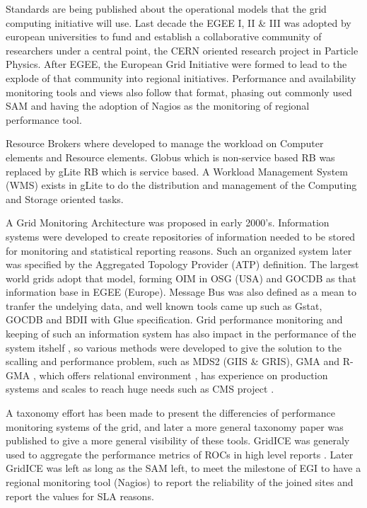 Standards are being published about the operational models that the grid computing initiative will use. Last decade the EGEE I, II \& III was adopted by european universities to fund and establish a collaborative community of researchers under a central point, the CERN oriented research project in Particle Physics. After EGEE, the European Grid Initiative were formed to lead to the explode of that community into regional initiatives. Performance and availability monitoring tools and views also follow that format, phasing out commonly used SAM \cite{egee3dsa122} and having the adoption of Nagios as the monitoring of regional performance tool.

Resource Brokers \cite{Kertesz06ataxonomy} where developed to manage the workload on Computer elements and Resource elements. Globus which is non-service based RB was replaced by gLite RB which is service based. A Workload Management System (WMS) exists in gLite to do the distribution and management of the Computing and Storage oriented tasks.

A Grid Monitoring Architecture \cite{tierney2002grid} was proposed in early 2000's. Information systems were developed to create repositories of information needed to be stored for monitoring and statistical reporting reasons. Such an organized system later was specified by the Aggregated Topology Provider (ATP) definition. The largest world grids adopt that model, forming OIM in OSG (USA) and GOCDB as that information base in EGEE (Europe). Message Bus was also defined as a mean to tranfer the undelying data, and well known tools came up such as Gstat, GOCDB and BDII with Glue specification. Grid performance monitoring and keeping of such an information system has also impact in the performance of the system itshelf \cite{zhang2003performance}, so various methods were developed to give the solution to the scalling and performance problem, such as MDS2 (GIIS \& GRIS), GMA and R-GMA \cite{wilson2004information}, which offers relational environment \cite{fisher2001relational}, has experience on production systems \cite{byrom-production} and scales to reach huge needs such as CMS project \cite{Bonacorsi2004,Byrom}.

A taxonomy effort has been made \cite{gerndt2004performance} to present the differencies of performance monitoring systems of the grid, and later a more general \cite{zanikolas2007importance} taxonomy paper was published to give a more general visibility of these tools. GridICE was generaly used to aggregate the performance metrics of ROCs in high level reports \cite{andreozzi2005gridice}. Later GridICE was left as long as the SAM left, to meet the milestone of EGI to have a regional monitoring tool (Nagios) to report the reliability of the joined sites and report the values for SLA reasons. 

